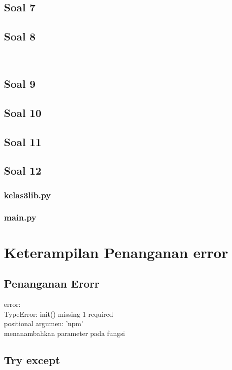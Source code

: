 \documentclass[12pt, times new roman]{report}
\begin{document}
\section*{Soal 7}


\section*{Soal 8}
\

\section*{Soal 9}


\section*{Soal 10}


\section*{Soal 11}


\section*{Soal 12}
\subsection*{kelas3lib.py}

\subsection*{main.py}


\chapter{Keterampilan Penanganan error}

\section*{Penanganan Erorr}

error:\\
TypeError: \textunderscore\textunderscore init\textunderscore\textunderscore () missing 1 required\\ positional argumen: 'npm'\\
menanambahkan parameter pada fungsi\\


\section*{Try except}

\end{document}
